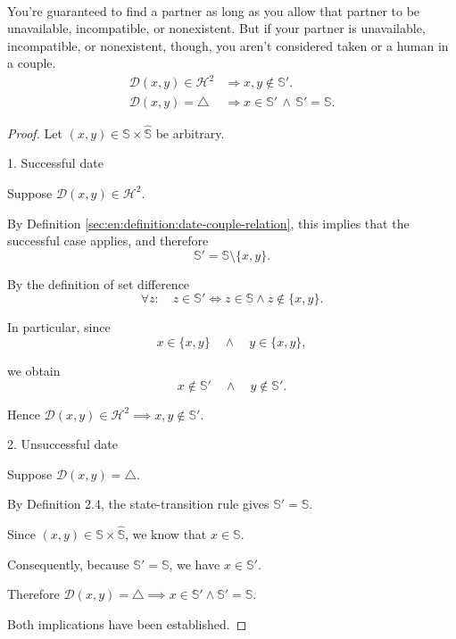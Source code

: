 \begin{corollary}\label{sec:en:corollary:guaranteed-partner-candidate-not-guaranteed-partner-principle}
    \leavevmode\\
    You're guaranteed to find a partner as long as you allow that partner to be unavailable, incompatible, or nonexistent. But if your partner is unavailable, incompatible, or nonexistent, though, you aren't considered taken or a human in a couple.
    \begin{align*}
        \mathcal{D}(x,y)\in\mathcal{H}^2&\Longrightarrow x,y\notin\mathbb{S}'.\\
        \mathcal{D}(x,y)=\triangle&\Longrightarrow x\in\mathbb{S}'\,\land\,\mathbb{S}'=\mathbb{S}.
    \end{align*}
    \begin{proof}
        Let $(x,y)\in\mathbb S\times\hat{\mathbb S}$ be arbitrary.

        1. Successful date

        Suppose $\mathcal D(x,y)\in\mathcal H^2.$

        By Definition \ref{sec:en:definition:date-couple-relation}, this implies that the successful case applies, and therefore
        $$\mathbb S'=\mathbb S\setminus\{x,y\}.$$

        By the definition of set difference
        $$\forall z:\quad
            z\in\mathbb S'
            \iff
            z\in\mathbb S\land z\notin\{x,y\}.$$

        In particular, since
        $$x\in\{x,y\}
            \quad\land\quad
            y\in\{x,y\},$$

        we obtain
        $$x\notin\mathbb S'
            \quad\land\quad
            y\notin\mathbb S'.$$

        Hence $\mathcal D(x,y)\in\mathcal H^2\implies x,y\notin\mathbb S'.$

        2. Unsuccessful date

        Suppose $\mathcal D(x,y)=\triangle.$

        By Definition 2.4, the state-transition rule gives $\mathbb S'=\mathbb S.$

        Since $(x,y)\in\mathbb S\times\hat{\mathbb S}$, we know that $x\in\mathbb S.$

        Consequently, because $\mathbb S'=\mathbb S$, we have $x\in\mathbb S'.$

        Therefore $\mathcal D(x,y)=\triangle\implies x\in\mathbb S'\land\mathbb S'=\mathbb S.$

        Both implications have been established.
    \end{proof}
\end{corollary}

